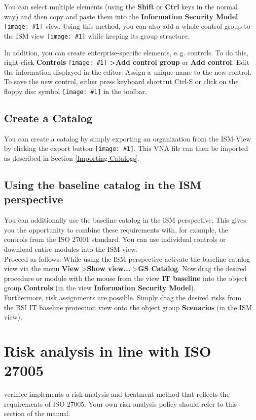 \documentclass[a4paper,10pt]{book}
\newcommand{\icon}[1]{\texttt{[image: \#1]}}
\begin{document}
You can select multiple elements (using the \textbf{Shift} or \textbf{Ctrl}
keys in the normal way) and then copy and paste them into the
\textbf{Information Security Model}
\icon{Icon/Informationssicherheitsmodell.png} view.
Using this method, you can also add a whole control group to the ISM view
\icon{Icon/Informationssicherheitsmodell.png}
while keeping its group structure.

In addition, you can create enterprise-specific elements, e.\,g. controls. To
do this, right-click \textbf{Controls} \icon{Icon/Controls.png}
\textbf{\textgreater Add control group} or \textbf{Add control}. Edit the
information displayed in the editor. Assign a unique name to the new control.
To save the new control, either press keyboard shortcut Ctrl-S or click on the
floppy disc symbol \icon{Icon/Disk.png} in the toolbar.

\subsection{Create a Catalog}
You can create a catalog by simply exporting an organization from the ISM-View
by clicking the export button \icon{Icon/Export}. This VNA file can then be
imported as described in Section \ref{Importing Catalogs}.

\subsection{Using the baseline catalog in the ISM perspective}
You can additionally use the baseline catalog in the ISM perspective. This gives you the opportunity to combine these requirements with, for example,
the controls from the ISO 27001 standard. You can use individual controls or download entire modules into the ISM view.
\newline\\
Proceed as follows: While using the ISM perspective activate the baseline catalog view via the menu \textbf{View} \textgreater \textbf{Show view...} \textgreater \textbf{GS Catalog}.
Now drag the desired procedure or module with the mouse from the view \textbf{IT baseline} into the object group \textbf{Controls} (in the view \textbf{Information Security Model}).
\newline\\
Furthermore, risk assignments are possible. Simply drag the desired risks from the BSI IT baseline protection view onto the object group \textbf{Scenarios} (in the ISM view).


\section{Risk analysis in line with ISO 27005}
\label{sec:risk-assessment-iso-27005}
verinice implements a risk analysis and treatment method that reflects the requirements of ISO 27005. Your own risk analysis policy should refer to this section of the manual.
\end{document}
